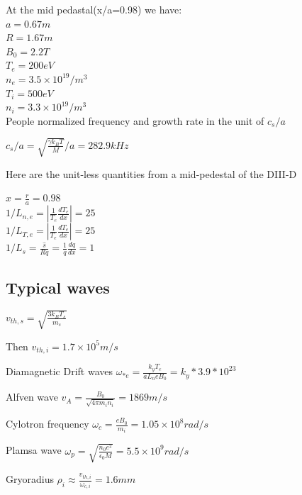 At the mid pedastal(x/a=0.98) we have:\\
$a=0.67m$\\
$R=1.67m$\\
$B_0=2.2T$\\
$T_e=200eV$\\
$n_e=3.5\times 10^{19} /m^3$\\
$T_i=500eV$\\
$n_i=3.3\times 10^{19} /m^3$\\

People normalized frequency and growth rate in the unit of $c_s/a$

$c_s/a=\sqrt{\frac{\gamma k_B T}{M}}/a=282.9kHz$


Here are the unit-less quantities from a mid-pedestal of the DIII-D

$x=\frac{r}{a}=0.98$\\
$1/L_{n,e}=|\frac{1}{T_e}\frac{dT_e}{d x}|=25$\\
$1/L_{T,e}=|\frac{1}{T_e}\frac{dT_e}{d x}|=25$\\
$1/L_s=\frac{\hat{s}}{Rq}=\frac{1}{q}\frac{dq}{dx}=1$\\

\subsection{Typical waves}

$v_{th,s}=\sqrt{\frac{3 k_B T_s}{m_s}}$

Then $v_{th,i}=1.7\times 10^{5} m/s$

Diamagnetic Drift waves $\omega_{*e}=\frac{k_yT_e }{a L_n eB_0}=k_y*3.9*10^{23}$

Alfven wave $v_A=\frac{B_0}{\sqrt{4\pi m_in_i}}=1869m/s$

Cylotron frequency $\omega_c=\frac{e B_0}{m_i}=1.05\times 10^{8} rad/s$

Plamsa wave $\omega_p=\sqrt{\frac{n_0 e^2}{\epsilon_0 M}}=5.5\times 10^9 rad/s$

Gryoradius $\rho_i\approx \frac{v_{th,i}}{\omega_{c,i}}=1.6mm$




